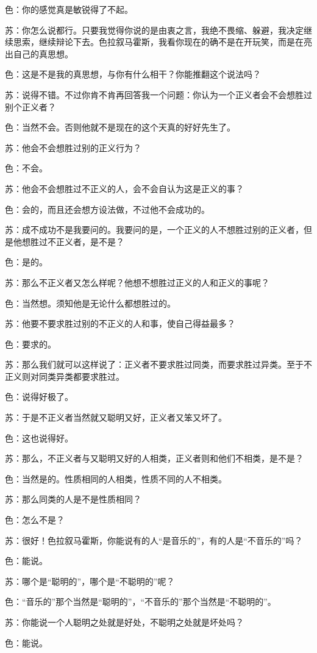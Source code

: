 \documentclass[12pt,oneside]{book}
\begin{document}
色：你的感觉真是敏锐得了不起。

苏：你怎么说都行。只要我觉得你说的是由衷之言，我绝不畏缩、躲避，我决定继续思索，继续辩论下去。色拉叙马霍斯，我看你现在的确不是在开玩笑，而是在亮出自己的真思想。

色：这是不是我的真思想，与你有什么相干？你能推翻这个说法吗？

苏：说得不错。不过你肯不肯再回答我一个问题：你认为一个正义者会不会想胜过别个正义者？

色：当然不会。否则他就不是现在的这个天真的好好先生了。

苏：他会不会想胜过别的正义行为？

色：不会。

苏：他会不会想胜过不正义的人，会不会自认为这是正义的事？

色：会的，而且还会想方设法做，不过他不会成功的。

苏：成不成功不是我要问的。我要问的是，一个正义的人不想胜过别的正义者，但是他想胜过不正义者，是不是？

色：是的。

苏：那么不正义者又怎么样呢？他想不想胜过正义的人和正义的事呢？

色：当然想。须知他是无论什么都想胜过的。

苏：他要不要求胜过别的不正义的人和事，使自己得益最多？

色：要求的。

苏：那么我们就可以这样说了：正义者不要求胜过同类，而要求胜过异类。至于不正义则对同类异类都要求胜过。

色：说得好极了。

苏：于是不正义者当然就又聪明又好，正义者又笨又坏了。

色：这也说得好。

苏：那么，不正义者与又聪明又好的人相类，正义者则和他们不相类，是不是？

色：当然是的。性质相同的人相类，性质不同的人不相类。

苏：那么同类的人是不是性质相同？

色：怎么不是？

苏：很好！色拉叙马霍斯，你能说有的人“是音乐的”，有的人是“不音乐的”吗？

色：能说。

苏：哪个是“聪明的”，哪个是“不聪明的”呢？

色：“音乐的”那个当然是“聪明的”，“不音乐的”那个当然是“不聪明的”。

苏：你能说一个人聪明之处就是好处，不聪明之处就是坏处吗？

色：能说。
\end{document}
